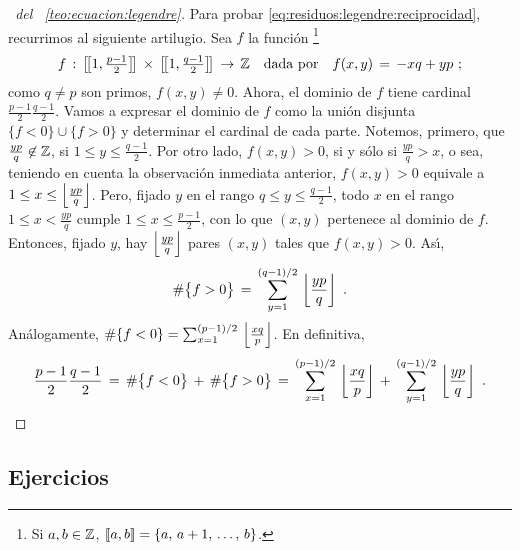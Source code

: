 \begin{proof}[\proofname~del \teoname~\ref{teo:ecuacion:legendre}]
	Para probar \eqref{eq:residuos:legendre:reciprocidad},
	recurrimos al siguiente artilugio. Sea $f$ la funci\'on%
	\footnote{
		Si $a,b\in\mathbb{Z}$, $\left[\!\left[a,b\right]\!\right]=\{a,\,a+1,\,\dots,\,b\}$.
	}
	\begin{displaymath}
		f\,:\,\left[\!\left[1,\tfrac{p-1} 2\right]\!\right]\,\times\,
			\left[\!\left[1,\tfrac{q-1} 2\right]\!\right]\,\rightarrow\,
			\mathbb{Z}
		\quad\text{dada por}\quad
		f(x,y)\,=\,-xq+yp
		\text{ ;}
	\end{displaymath}
	como $q\neq p$ son primos, $f(x,y)\neq 0$.
	Ahora, el dominio de $f$ tiene cardinal $\frac{p-1} 2\frac{q-1} 2$.
	Vamos a expresar el dominio de $f$ como la uni\'on disjunta
	$\{f<0\}\cup\{f>0\}$ y determinar el cardinal de cada parte.
	Notemos, primero, que $\frac{yp} q\not\in\mathbb{Z}$, si
	$1\leq y\leq\frac{q-1} 2$. Por otro lado, $f(x,y)>0$, si y s\'olo
	si $\frac{yp} q>x$, o sea, teniendo en cuenta la observaci\'on
	inmediata anterior, $f(x,y)>0$ equivale a
	$1\leq x\leq \left\lfloor{\frac{yp} q}\right\rfloor$. Pero, fijado $y$ en el rango
	$q\leq y\leq\frac{q-1} 2$, todo $x$ en el rango $1\leq x<\frac{yp} q$
	cumple $1\leq x\leq\frac{p-1} 2$, con lo que $(x,y)$ pertenece al
	dominio de $f$. Entonces, fijado $y$, hay $\left\lfloor{\frac{yp} q}\right\rfloor$ pares
	$(x,y)$ tales que $f(x,y)>0$. As\'{\i},
	\begin{displaymath}
		\#{\big\{f>0\big\}}\,=\,\sum_{y=1}^{(q-1)/2}\,
			\left\lfloor{\frac{yp} q}\right\rfloor
		\text{ .}
	\end{displaymath}
	An\'alogamente,
	\begin{math}
		\#{\{f<0\}}=\sum_{x=1}^{(p-1)/2}\,\left\lfloor{\frac{xq} p}\right\rfloor
	\end{math}.
	En definitiva,
	\begin{displaymath}
		\frac{p-1} 2\frac{q-1} 2\,=\,
		\#{\big\{f<0\big\}}\,+\,
			\#{\big\{f>0\big\}}\,=\,
			\sum_{x=1}^{(p-1)/2}\,\left\lfloor{\frac{xq} p}\right\rfloor\,+\,
			\sum_{y=1}^{(q-1)/2}\,\left\lfloor{\frac{yp} q}\right\rfloor
		\text{ .}
	\end{displaymath}
\end{proof}

\subsection*{Ejercicios}


